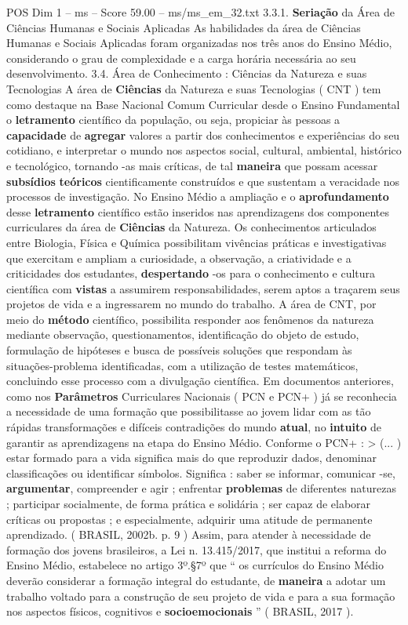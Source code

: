\begin{textsample}{POS Dim 1 – ms – Score 59.00 – ms/ms\_em\_32.txt}  \label{ex:f1_pos_182}
3.3.1. \textbf{Seriação} da Área de Ciências Humanas e Sociais Aplicadas As habilidades da área de Ciências Humanas e Sociais Aplicadas foram organizadas nos três anos do Ensino Médio, considerando o grau de complexidade e a carga horária necessária ao seu desenvolvimento. 3.4.
Área de Conhecimento : Ciências da Natureza e suas Tecnologias A área de \textbf{Ciências} da Natureza e suas Tecnologias ( CNT ) tem como destaque na Base Nacional Comum Curricular desde o Ensino Fundamental o \textbf{letramento} científico da população, ou seja, propiciar às pessoas a \textbf{capacidade} de \textbf{agregar} valores a partir dos conhecimentos e experiências do seu cotidiano, e interpretar o mundo nos aspectos social, cultural, ambiental, histórico e tecnológico, tornando -as mais críticas, de tal \textbf{maneira} que possam acessar \textbf{subsídios} \textbf{teóricos} cientificamente construídos e que sustentam a veracidade nos processos de investigação.
No Ensino Médio a ampliação e o \textbf{aprofundamento} desse \textbf{letramento} científico estão inseridos nas aprendizagens dos componentes curriculares da área de \textbf{Ciências} da Natureza.
Os conhecimentos articulados entre Biologia, Física e Química possibilitam vivências práticas e investigativas que exercitam e ampliam a curiosidade, a observação, a criatividade e a criticidades dos estudantes, \textbf{despertando} -os para o conhecimento e cultura científica com \textbf{vistas} a assumirem responsabilidades, serem aptos a traçarem seus projetos de vida e a ingressarem no mundo do trabalho.
A área de CNT, por meio do \textbf{método} científico, possibilita responder aos fenômenos da natureza mediante observação, questionamentos, identificação do objeto de estudo, formulação de hipóteses e busca de possíveis soluções que respondam às situações-problema identificadas, com a utilização de testes matemáticos, concluindo esse processo com a divulgação científica.
Em documentos anteriores, como nos \textbf{Parâmetros} Curriculares Nacionais ( PCN e PCN+ ) já se reconhecia a necessidade de uma formação que possibilitasse ao jovem lidar com as tão rápidas transformações e difíceis contradições do mundo \textbf{atual}, no \textbf{intuito} de garantir as aprendizagens na etapa do Ensino Médio.
Conforme o PCN+ : > (... ) estar formado para a vida significa mais do que reproduzir dados, denominar classificações ou identificar símbolos.
Significa : saber se informar, comunicar -se, \textbf{argumentar}, compreender e agir ; enfrentar \textbf{problemas} de diferentes naturezas ; participar socialmente, de forma prática e solidária ; ser capaz de elaborar críticas ou propostas ; e especialmente, adquirir uma atitude de permanente aprendizado. ( BRASIL, 2002b. p. 9 ) Assim, para atender à necessidade de formação dos jovens brasileiros, a Lei n. 13.415/2017, que institui a reforma do Ensino Médio, estabelece no artigo 3º.§7º que “ os currículos do Ensino Médio deverão considerar a formação integral do estudante, de \textbf{maneira} a adotar um trabalho voltado para a construção de seu projeto de vida e para a sua formação nos aspectos físicos, cognitivos e \textbf{socioemocionais} ” ( BRASIL, 2017 ).

\end{textsample}
